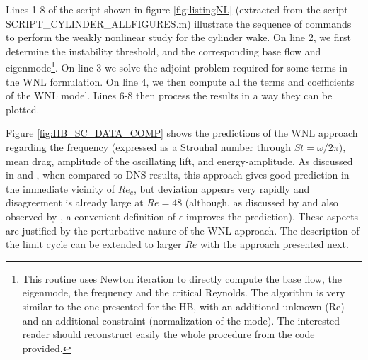 \documentclass[twocolumn,10pt]{asme2ej}
\begin{document}
Lines 1-8 of the script shown in figure \ref{fig:listingNL} (extracted from the script 
{\sf SCRIPT\_CYLINDER\_ALLFIGURES.m}) illustrate the sequence of commands to 
perform the weakly nonlinear study for the cylinder wake.
On line 2, we first determine the instability threshold, and the corresponding base flow and eigenmode\footnote{This routine uses Newton iteration to directly compute the base flow, the eigenmode, the frequency and the critical Reynolds. The algorithm is very similar to the one presented for the HB, with an additional unknown (Re) and an additional constraint (normalization of the mode). The interested reader should reconstruct easily the whole procedure from the code provided.}. 
On line 3 we solve the adjoint problem required for some terms in the WNL formulation.
On line 4, we then compute all the terms and coefficients of the WNL model.
Lines 6-8 then process the results in a way they can be plotted.




Figure \ref{fig:HB_SC_DATA_COMP} shows the predictions of the WNL approach regarding the frequency (expressed as a Strouhal number through $St = \omega/2\pi$), mean drag, amplitude of the oscillating lift, and energy-amplitude.
As discussed in \cite{SippLebedev} and \cite{FDR2016}, when compared to DNS results, this approach gives good prediction in the immediate vicinity of $Re_c$, but deviation appears very rapidly and disagreement is already large at $Re=48$ (although, as discussed by \cite{FDR2016} and also observed by \cite{Tchoufag2015}, a convenient definition of $\epsilon$ improves the prediction). 
These aspects are justified by the perturbative nature of the WNL approach. The description of the limit cycle can be extended to larger $Re$ with the approach presented next.  
\end{document}
